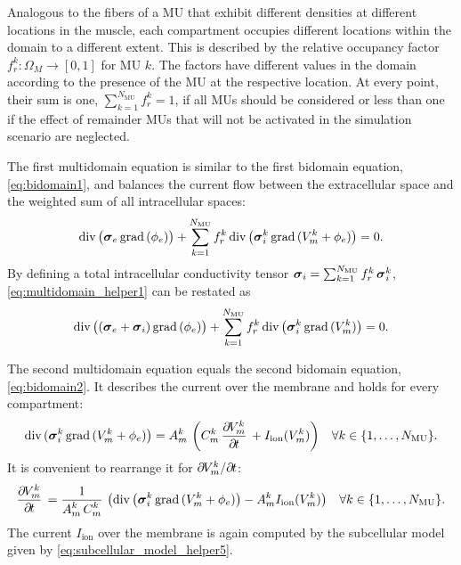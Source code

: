 Analogous to the fibers of a MU that exhibit different densities at different locations in the muscle, each compartment occupies different locations within the domain to a different extent. This is described by the relative occupancy factor $f_r^k: \Omega_M \to [0,1]$ for MU $k$. The factors have different values in the domain according to the presence of the MU at the respective location. At every point, their sum is one, $\sum_{k=1}^{N_\text{MU}} f_r^k = 1$, if all MUs should be considered or less than one if the effect of remainder MUs that will not be activated in the simulation scenario are neglected.

The first multidomain equation is similar to the first bidomain equation, \cref{eq:bidomain1}, and balances the current flow between the extracellular space and the weighted sum of all intracellular spaces:%
\begin{align}\label{eq:multidomain_helper1}
  \hbox{div} \,\big(\boldsymbol{\sigma}_e\,\hbox{grad} \,(\phi_e)\big)  + \displaystyle\sum\limits_{k=1}^{N_\text{MU}} f_r^k\,\hbox{div} \,\big(\boldsymbol{\sigma}_i^k\,\hbox{grad} \,(V_m^k + \phi_e)\big) = 0.
\end{align}
By defining a total intracellular conductivity tensor $\boldsymbol{\sigma}_i = \sum_{k=1}^{N_\text{MU}}f_r^k\,\boldsymbol{\sigma}_i^k$, \cref{eq:multidomain_helper1} can be restated as
%
\begin{align}\label{eq:multidomain1}
  \hbox{div} \,\big((\boldsymbol{\sigma}_e + \boldsymbol{\sigma}_i)\,\hbox{grad} \,(\phi_e)\big) + \sum\limits_{k=1}^{N_\text{MU}} f_r^k\,\hbox{div} \,\big(\boldsymbol{\sigma}_i^k\,\hbox{grad} \,(V_m^k)\big) = 0.
\end{align}

The second multidomain equation equals the second bidomain equation, \cref{eq:bidomain2}. It describes the current over the membrane and holds for every compartment:%
\begin{align*}
  \div(\bfsigma_i^k\,\grad(V_m^k + \phi_e)\big) = A_m^k\,\left(C_m^k\,\p{V_m^k}{t} + I_\text{ion}(V_m^k)\right) && \forall k \in \{1, \dots, N_\text{MU}\}.
\end{align*}
%
It is convenient to rearrange it for $\partial{}V_m^k / \p t$:
%
\begin{align}\label{eq:multidomain2}
  \p{V_m^k}{t} = \dfrac{1}{A_m^k\,C_m^k} \left(\div\big(\bfsigma_i^k\,\grad(V_m^k + \phi_e)\big) - A_m^k I_\text{ion}(V_m^k)\right) && \forall  k \in \{1, \dots, N_\text{MU}\}.
\end{align}
%
The current $I_\text{ion}$ over the membrane is again computed by the subcellular model given by \cref{eq:subcellular_model_helper5}.

